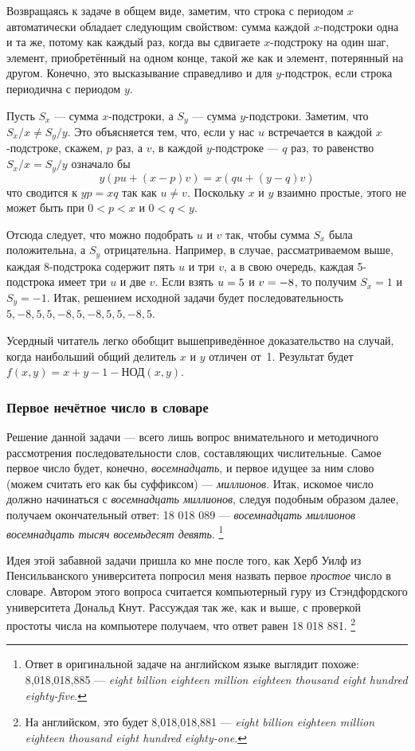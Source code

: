 Возвращаясь к задаче в общем виде, 
заметим, что строка с периодом $x$ автоматически обладает следующим свойством: сумма каждой $x$-подстроки одна и та же, потому как каждый раз, когда вы сдвигаете $x$-подстроку на один шаг, элемент, приобретённый на одном конце, такой же как и элемент, потерянный на другом.
Конечно, это высказывание справедливо и для $y$-подстрок, если строка периодична с периодом $y$.

Пусть $S_x$ --- сумма $x$-подстроки, а $S_y$ --- сумма $y$-подстроки.
Заметим, что $S_x/x\ne S_y/y$.
Это объясняется тем, что, если у нас $u$ встречается в каждой
 $x$-подстроке, скажем, $p$ раз, а $v$, в каждой $y$-подстроке --- $q$ раз, 
 то равенство $S_x/x=S_y/y$
 означало бы 
\[y(pu+(x-p)v)=x(qu+(y-q)v)\]
что сводится к $yp=xq$ так как $u\ne v$.
Поскольку $x$ и $y$ взаимно простые, этого не может быть при $0<p<x$ и $0<q<y$.

Отсюда следует, что можно подобрать $u$ и $v$ так, чтобы сумма $S_x$ была положительна, а $S_y$ отрицательна.
Например, в случае, рассматриваемом выше, каждая 8-подстрока содержит пять $u$ и три $v$, 
а в свою очередь, каждая 5-подстрока имеет три $u$ и две $v$.
Если взять $u\z=5$ и $v\z=-8$, то получим $S_x=1$ и $S_y=-1$.
Итак, решением исходной задачи будет последовательность $5,-8,5,5,-8,5,-8,5,5,-8,5$.
\heart

Усердный читатель легко обобщит вышеприведённое доказательство на случай, 
когда наибольший общий делитель $x$ и $y$ отличен от~1.
Результат будет $f(x,y)=x+y-1-\text{НОД}(x,y)$.

\subsubsection*{Первое нечётное число в словаре}%

Решение данной задачи --- всего лишь вопрос внимательного и методичного рассмотрения последовательности слов, составляющих числительные.
Самое первое число будет, конечно, \emph{восемнадцать}, и первое идущее за ним слово (можем считать его как бы суффиксом) --- \emph{миллионов}.
Итак, искомое число должно начинаться с \emph{восемнадцать миллионов}, следуя подобным образом далее, получаем окончательный ответ: 18 018 089 --- \emph{восемнадцать миллионов восемнадцать тысяч восемьдесят девять}.%
\footnote{Ответ в оригинальной задаче на английском языке выглядит похоже: 8,018,018,885 --- \emph{eight billion eighteen million eighteen thousand eight hundred eighty-five}.}
\heart

Идея этой забавной задачи пришла ко мне после того, как Херб Уилф из Пенсильванского университета %
попросил меня назвать первое \emph{простое} число в словаре.
Автором этого вопроса считается компьютерный гуру из Стэндфордского университета Дональд Кнут. %
Рассуждая так же, как и выше, с проверкой простоты числа на компьютере
получаем, что ответ равен 18 018 881.%
\footnote{На английском, это будет 8,018,018,881 --- \emph{eight billion eighteen million eighteen thousand eight hundred eighty-one}.
}

